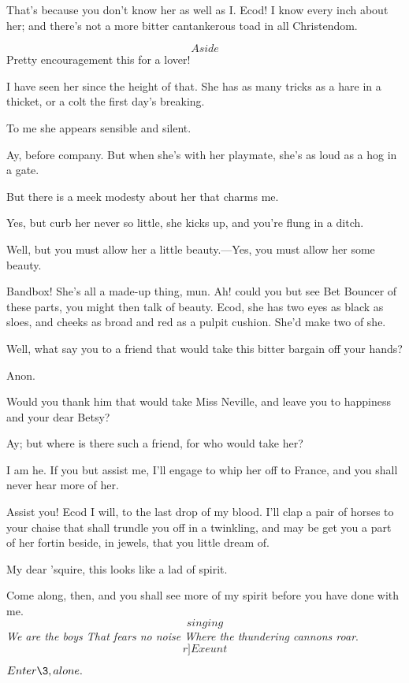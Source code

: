 \documentclass{book}
\begin{document}
\5  That's because you don't know her as well as I.  Ecod! I know
every inch about her; and there's not a more bitter cantankerous toad
in all Christendom.

\4  \[Aside\]  Pretty encouragement this for a lover!

\5  I have seen her since the height of that.  She has as many
tricks as a hare in a thicket, or a colt the first day's breaking.

\4  To me she appears sensible and silent.

\5  Ay, before company.  But when she's with her playmate, she's as
loud as a hog in a gate.

\4  But there is a meek modesty about her that charms me.

\5  Yes, but curb her never so little, she kicks up, and you're
flung in a ditch.

\4  Well, but you must allow her a little beauty.---Yes, you must
allow her some beauty.

\5  Bandbox!  She's all a made-up thing, mun.  Ah! could you but see
Bet Bouncer of these parts, you might then talk of beauty.  Ecod, she
has two eyes as black as sloes, and cheeks as broad and red as a pulpit
cushion.  She'd make two of she.

\4  Well, what say you to a friend that would take this bitter
bargain off your hands?

\5  Anon.

\4  Would you thank him that would take Miss Neville, and leave
you to happiness and your dear Betsy?

\5  Ay; but where is there such a friend, for who would take her?

\4  I am he.  If you but assist me, I'll engage to whip her off
to France, and you shall never hear more of her.

\5  Assist you!  Ecod I will, to the last drop of my blood.  I'll
clap a pair of horses to your chaise that shall trundle you off in a
twinkling, and may be get you a part of her fortin beside, in jewels,
that you little dream of.

\4  My dear 'squire, this looks like a lad of spirit.

\5  Come along, then, and you shall see more of my spirit before you
have done with me. \[singing\] \textsl{We are the boys
That fears no noise
Where the thundering cannons roar}.  \[r]Exeunt\]



\Act


\(Enter \3, alone.\)
\end{document}
